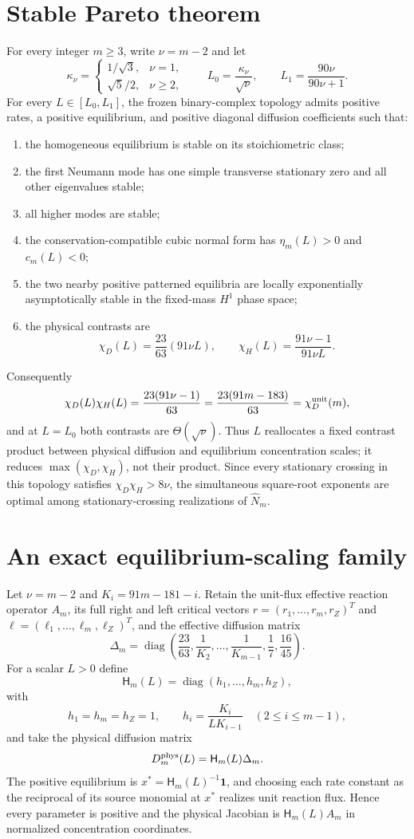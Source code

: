\section*{Stable Pareto theorem}
For every integer $m\ge3$, write $\nu=m-2$ and let
\[
 \kappa_\nu=\begin{cases}
 1/\sqrt3,&\nu=1,\\
 \sqrt5/2,&\nu\ge2,
 \end{cases}
 \qquad
 L_0=\frac{\kappa_\nu}{\sqrt\nu},
 \qquad
 L_1=\frac{90\nu}{90\nu+1}.
\]
For every $L\in[L_0,L_1]$, the frozen binary-complex topology admits positive
rates, a positive equilibrium, and positive diagonal diffusion coefficients
such that:
\begin{enumerate}
\item the homogeneous equilibrium is stable on its stoichiometric class;
\item the first Neumann mode has one simple transverse stationary zero and all
other eigenvalues stable;
\item all higher modes are stable;
\item the conservation-compatible cubic normal form has $\eta_m(L)>0$ and
$c_m(L)<0$;
\item the two nearby positive patterned equilibria are locally exponentially
asymptotically stable in the fixed-mass $H^1$ phase space;
\item the physical contrasts are
\[
 \chi_D(L)=\frac{23}{63}(91\nu L),
 \qquad
 \chi_H(L)=\frac{91\nu-1}{91\nu L}.
\]
\end{enumerate}
Consequently
\[
 \chi_D(L)\chi_H(L)=\frac{23(91\nu-1)}{63}
 =\frac{23(91m-183)}{63}=\chi_D^{\rm unit}(m),
\]
and at $L=L_0$ both contrasts are $\Theta(\sqrt{\nu})$.  Thus $L$ reallocates
a fixed contrast product between physical diffusion and equilibrium
concentration scales; it reduces $\max(\chi_D,\chi_H)$, not their product.
Since every stationary crossing in this topology satisfies
$\chi_D\chi_H>8\nu$, the simultaneous square-root exponents are optimal among
stationary-crossing realizations of $\widehat N_m$.


\section*{An exact equilibrium-scaling family}
Let $\nu=m-2$ and $K_i=91m-181-i$.  Retain the unit-flux effective reaction
operator $A_m$, its full right and left critical vectors
$r=(r_1,\ldots,r_m,r_Z)^T$ and
$\ell=(\ell_1,\ldots,\ell_m,\ell_Z)^T$, and the effective diffusion matrix
\[
 \Delta_m=\operatorname{diag}\left(
 \frac{23}{63},\frac1{K_2},\ldots,\frac1{K_{m-1}},
 \frac17,\frac{16}{45}\right).
\]
For a scalar $L>0$ define
\[
 \mathsf H_m(L)=\operatorname{diag}(h_1,\ldots,h_m,h_Z),
\]
with
\[
 h_1=h_m=h_Z=1,
 \qquad
 h_i=\frac{K_i}{L K_{i-1}}
 \quad(2\le i\le m-1),
\]
and take the physical diffusion matrix
\[
 D_m^{\rm phys}(L)=\mathsf H_m(L)\Delta_m.
\]
The positive equilibrium is $x^*=\mathsf H_m(L)^{-1}\mathbf1$, and choosing each
rate constant as the reciprocal of its source monomial at $x^*$ realizes
unit reaction flux.  Hence every parameter is positive and the physical
Jacobian is $\mathsf H_m(L)A_m$ in normalized concentration coordinates.

